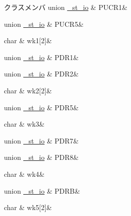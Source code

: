 \begin{DoxyFields}{クラスメンバ}
union \hyperlink{3694s_8h_da/db8/union__st__io_8PUCR1}{\+\_\+st\+\_\+io}\label{3694s_8h_aae0e529f1a0cc2574ede8153dd390935}
&
P\+U\+C\+R1&
\\
\hline

union \hyperlink{3694s_8h_d3/d03/union__st__io_8PUCR5}{\+\_\+st\+\_\+io}\label{3694s_8h_a74a58e1913fa5d2553a4111ec413aec8}
&
P\+U\+C\+R5&
\\
\hline

char\label{3694s_8h_a473627a22c22b8ce0b107f359168d707}
&
wk1\mbox{[}2\mbox{]}&
\\
\hline

union \hyperlink{3694s_8h_dc/df3/union__st__io_8PDR1}{\+\_\+st\+\_\+io}\label{3694s_8h_ace2422b7ec781d12585d860b3601d475}
&
P\+D\+R1&
\\
\hline

union \hyperlink{3694s_8h_d8/d84/union__st__io_8PDR2}{\+\_\+st\+\_\+io}\label{3694s_8h_a028e22bbd25377d1d0262a622ef61508}
&
P\+D\+R2&
\\
\hline

char\label{3694s_8h_a255d5af3a921cc2612e0ea5961ee0e38}
&
wk2\mbox{[}2\mbox{]}&
\\
\hline

union \hyperlink{3694s_8h_dc/d2a/union__st__io_8PDR5}{\+\_\+st\+\_\+io}\label{3694s_8h_acd3857fdd8e63ca6b4d8d0f8a10ecab0}
&
P\+D\+R5&
\\
\hline

char\label{3694s_8h_a75bd1db9e2cfeeccdccfdff6193c3dd3}
&
wk3&
\\
\hline

union \hyperlink{3694s_8h_d3/d1a/union__st__io_8PDR7}{\+\_\+st\+\_\+io}\label{3694s_8h_aa592b03ea177d913974ecf78f1a467ed}
&
P\+D\+R7&
\\
\hline

union \hyperlink{3694s_8h_db/d69/union__st__io_8PDR8}{\+\_\+st\+\_\+io}\label{3694s_8h_a830f2ca51e3a1d2809593b1264580548}
&
P\+D\+R8&
\\
\hline

char\label{3694s_8h_ae544f060c15cf9fc9d697888274ba174}
&
wk4&
\\
\hline

union \hyperlink{3694s_8h_d3/d6d/union__st__io_8PDRB}{\+\_\+st\+\_\+io}\label{3694s_8h_ac3bbfe824f41df3392becda5aae19332}
&
P\+D\+R\+B&
\\
\hline

char\label{3694s_8h_ae54874bd8b41e0941e7b3e380220eb58}
&
wk5\mbox{[}2\mbox{]}&
\\
\hline


\end{DoxyFields}

